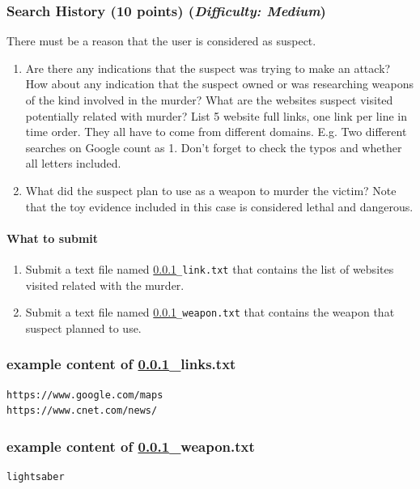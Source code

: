 \documentclass[letterpaper,12pt]{report}
\begin{document}
\subsubsection{Search History (10 points)    \hfill\rm\normalsize (\emph{Difficulty: Medium})}
\label{sec:search_history}
There must be a reason that the user is considered as suspect.

\begin{enumerate}
\item Are there any indications that the suspect was trying to make an attack? How about any indication that the suspect owned or was researching weapons of the kind involved in the murder? What are the websites suspect visited potentially related with murder? List 5 website full links, one link per line in time order. They all have to come from different domains. E.g. Two different searches on Google count as 1. Don't forget to check the typos and whether all letters included.
\item What did the suspect plan to use as a weapon to murder the victim? Note that the toy evidence included in this case is considered lethal and dangerous.
\end{enumerate}

\paragraph{What to submit}
\begin{enumerate}
\item Submit a text file named \texttt{\ref{sec:search_history}\_link.txt} that contains the list of websites visited related with the murder.
\item Submit a text file named \texttt{\ref{sec:search_history}\_weapon.txt} that contains the weapon that suspect planned to use.
\end{enumerate}

\newpage

\subsubsection*{example content of {\ref{sec:search_history}\_links.txt}}
\begin{mdframed}
\begin{Verbatim}
https://www.google.com/maps
https://www.cnet.com/news/
\end{Verbatim}
\end{mdframed}

\subsubsection*{example content of {\ref{sec:search_history}\_weapon.txt}}
\begin{mdframed}
\begin{Verbatim}
lightsaber
\end{Verbatim}
\end{mdframed}
\end{document}
